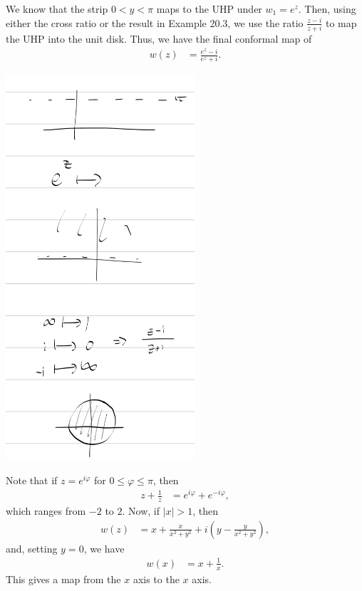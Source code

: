 \documentclass[10pt]{mypackage}
\begin{document}
\begin{solution}[20.12]
  We know that the strip $0 < y < \pi$ maps to the UHP under $w_1 = e^z$. Then, using either the cross ratio or the result in Example 20.3, we use the ratio $\frac{z-i}{z+i}$ to map the UHP into the unit disk. Thus, we have the final conformal map of 
  \begin{align*}
    w(z) &= \frac{e^{z}- i}{e^{z} + i}.
  \end{align*}
  \begin{center}
    \includegraphics[width=7cm]{images/20_12.png}
  \end{center}
\end{solution}
\begin{solution}[20.14]
  Note that if $z = e^{i\varphi}$ for $0 \leq \varphi \leq \pi$, then
  \begin{align*}
    z + \frac{1}{z} &= e^{i\varphi} + e^{-i\varphi},
  \end{align*}
  which ranges from $-2$ to $2$. Now, if $|x| > 1$, then
  \begin{align*}
    w\left( z \right) &= x + \frac{x}{x^2 + y^2} + i \left( y - \frac{y}{x^2 + y^2} \right),
  \end{align*}
  and, setting $y = 0$, we have
  \begin{align*}
    w(x) &= x + \frac{1}{x}.
  \end{align*}
  This gives a map from the $x$ axis to the $x$ axis.
\end{solution}
\end{document}
